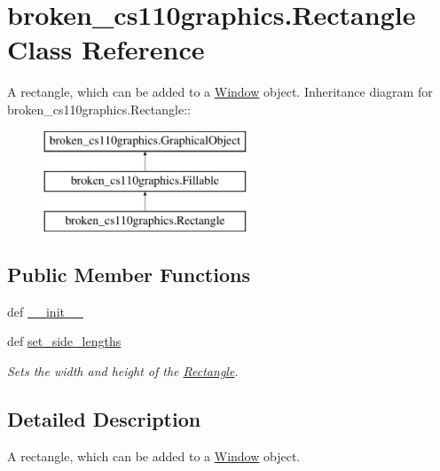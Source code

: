 \hypertarget{classbroken__cs110graphics_1_1Rectangle}{
\section{broken\_\-cs110graphics.Rectangle Class Reference}
\label{classbroken__cs110graphics_1_1Rectangle}
}


A rectangle, which can be added to a \hyperlink{classbroken__cs110graphics_1_1Window}{Window} object.  
Inheritance diagram for broken\_\-cs110graphics.Rectangle::\begin{figure}[H]
\begin{center}
\leavevmode
\includegraphics[height=3cm]{classbroken__cs110graphics_1_1Rectangle}
\end{center}
\end{figure}
\subsection*{Public Member Functions}
\begin{DoxyCompactItemize}
\item 
def \hyperlink{classbroken__cs110graphics_1_1Rectangle_a9b24dd6edcd39c6544aaad5f5aab0760}{\_\-\_\-init\_\-\_\-}
\item 
def \hyperlink{classbroken__cs110graphics_1_1Rectangle_ad7c925f2f7ec960cf4d8e113c180628f}{set\_\-side\_\-lengths}
\begin{DoxyCompactList}\small\item\em Sets the width and height of the \hyperlink{classbroken__cs110graphics_1_1Rectangle}{Rectangle}. \item\end{DoxyCompactList}\end{DoxyCompactItemize}


\subsection{Detailed Description}
A rectangle, which can be added to a \hyperlink{classbroken__cs110graphics_1_1Window}{Window} object. 

